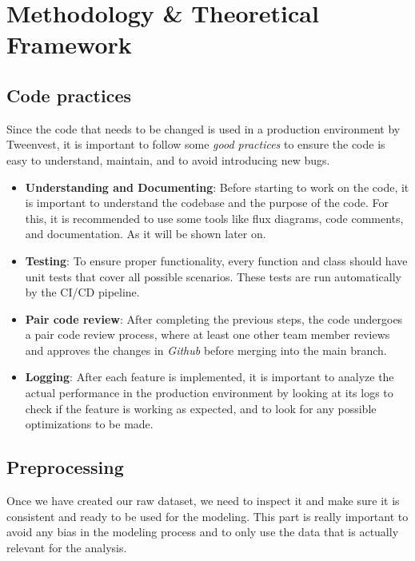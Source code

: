 \documentclass[11pt,english,a4paper,hidelinks]{book}
\begin{document}
\chapter{Methodology \& Theoretical Framework}

\section{Code practices}
Since the code that needs to be changed is used in a production environment by Tweenvest, it is important to follow some \textit{good practices} to ensure the code is easy to understand, maintain, and to avoid introducing new bugs.

\begin{itemize}
  \item \textbf{Understanding and Documenting}: Before starting to work on the code, it is important to understand the codebase and the purpose of the code. For this, it is recommended to use some tools like flux diagrams, code comments, and documentation. As it will be shown later on.
  \item \textbf{Testing}: To ensure proper functionality, every function and class should have unit tests that cover all possible scenarios. These tests are run automatically by the CI/CD pipeline.
  \item \textbf{Pair code review}: After completing the previous steps, the code undergoes a pair code review process, where at least one other team member reviews and approves the changes in \textit{Github} before merging into the main branch.
  \item \textbf{Logging}: After each feature is implemented, it is important to analyze the actual performance in the production environment by looking at its logs to check if the feature is working as expected, and to look for any possible optimizations to be made.
\end{itemize}

\section{Preprocessing}

Once we have created our raw dataset, we need to inspect it and make sure it is consistent and ready to be used for the modeling. This part is really important to avoid any bias in the modeling process and to only use the data that is actually relevant for the analysis.
\end{document}
